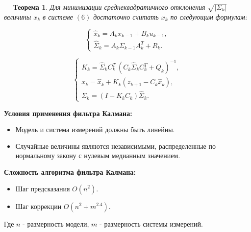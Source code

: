 \documentclass[12pt, a4paper]{article}
\newtheorem{theorem}{$\quad$ Теорема}
\begin{document}
\begin{theorem}
Для минимизации среднеквадратичного отклонения $\sqrt{\vert \Sigma_{k} \vert}$ величины $x_{k}$ в системе $(6)$ достаточно считать $x_k$ по следующим формулам:

\begin{equation}
\begin{cases}
\widehat{x}_{k} = A_{k}x_{k-1} + B_{k}u_{k-1}, \\
\widehat{\Sigma}_k = A_k\Sigma_{k-1}A_k^T + R_k.
\end{cases}
\end{equation}

\begin{equation}
\begin{cases}
K_k = \widehat{\Sigma}_k C_k^T \:(C_k \widehat{\Sigma}_k C_k^T + Q_k)^{-1}, \\
x_k = \widehat{x}_{k} + K_k(z_{k+1} - C_k \widehat{x}_{k}), \\
\Sigma_k = (I - K_k C_k)\widehat{\Sigma}_k.
\end{cases}
\end{equation}

\end{theorem}
\textbf{Условия применения фильтра Калмана:}
\begin{itemize}
\item Модель и система измерений должны быть линейны. \\

\begin{figure}[htbp]
\label{ris:foto2.jpg}
\end{figure}

\item Случайные величины являются независимыми, распределенные по нормальному закону с нулевым медианным значением.
\end{itemize}
\textbf{Сложность алгоритма фильтра Калмана:}

\begin{itemize}
\item Шаг предсказания $O(n^2)$.
\item Шаг коррекции $O(n^2 + m^{2.4})$.
\end{itemize}
Где $n$ - размерность модели, $m$ - размерность системы измерений.
\end{document}
